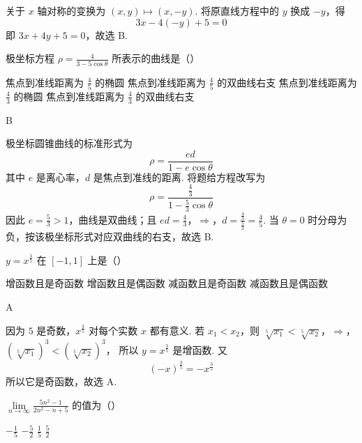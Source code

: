 \begin{solution}
关于 \(x\) 轴对称的变换为 \((x,y)\mapsto(x,-y)\). 将原直线方程中的 \(y\) 换成 \(-y\)，得
\[
3x-4(-y)+5=0
\]
即 \(3x+4y+5=0\)，故选 B.
\end{solution}

\begin{problem}
极坐标方程 \(\rho=\frac{4}{3-5\cos\theta}\) 所表示的曲线是（\quad）

\choices
    {焦点到准线距离为 \(\frac{4}{5}\) 的椭圆}
    {焦点到准线距离为 \(\frac{4}{5}\) 的双曲线右支}
    {焦点到准线距离为 \(\frac{4}{3}\) 的椭圆}
    {焦点到准线距离为 \(\frac{4}{3}\) 的双曲线右支}
\end{problem}

\begin{answer}
B
\end{answer}

\begin{solution}
极坐标圆锥曲线的标准形式为
\[
\rho=\frac{ed}{1-e\cos\theta}
\]
其中 \(e\) 是离心率，\(d\) 是焦点到准线的距离. 将题给方程改写为
\[
\rho=\frac{\frac{4}{3}}{1-\frac{5}{3}\cos\theta}
\]
因此 \(e=\frac{5}{3}>1\)，曲线是双曲线；且
\(ed=\frac{4}{3}\)，\(\Longrightarrow\)，\(d=\frac{\frac{4}{3}}{\frac{5}{3}}=\frac45\).
当 \(\theta=0\) 时分母为负，按该极坐标形式对应双曲线的右支，故选 B.
\end{solution}

\begin{problem}
\(y=x^{\frac{3}{5}}\) 在 \([-1,1]\) 上是（\quad）

\choices
    {增函数且是奇函数}
    {增函数且是偶函数}
    {减函数且是奇函数}
    {减函数且是偶函数}
\end{problem}

\begin{answer}
A
\end{answer}

\begin{solution}
因为 \(5\) 是奇数，\(x^{\frac{3}{5}}\) 对每个实数 \(x\) 都有意义. 若 \(x_1<x_2\)，则
\(\sqrt[5]{x_1}<\sqrt[5]{x_2}\)，\(\Longrightarrow\)，\(\left(\sqrt[5]{x_1}\right)^3<\left(\sqrt[5]{x_2}\right)^3\)，
所以 \(y=x^{\frac{3}{5}}\) 是增函数. 又
\[
(-x)^{\frac{3}{5}}=-x^{\frac{3}{5}}
\]
所以它是奇函数，故选 A.
\end{solution}

\begin{problem}
\(\displaystyle\lim\limits_{n\to\infty}\frac{5n^2-1}{2n^2-n+5}\) 的值为（\quad）

\choices
    {\(-\frac{1}{5}\)}
    {\(-\frac{5}{2}\)}
    {\(\frac{1}{5}\)}
    {\(\frac{5}{2}\)}
\end{problem}

